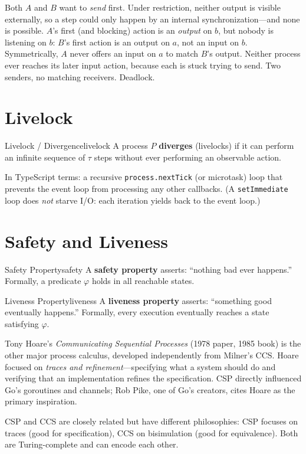 \documentclass[11pt, a4paper, oneside]{book}
\newcommand{\lc}[1]{\texttt{#1}}
\begin{document}
Both $A$ and $B$ want to \emph{send} first. Under restriction, neither output
is visible externally, so a step could only happen by an internal
synchronization---and none is possible. $A$'s first (and blocking) action is
an \emph{output} on $b$, but nobody is listening on $b$: $B$'s first action is
an output on $a$, not an input on $b$. Symmetrically, $A$ never offers an
input on $a$ to match $B$'s output. Neither process ever reaches its later
input action, because each is stuck trying to send. Two senders, no matching
receivers. Deadlock.

\section{Livelock}

\begin{defn}{Livelock / Divergence}{livelock}
A process $P$ \textbf{diverges} (livelocks) if it can perform an infinite
sequence of $\tau$ steps without ever performing an observable action.
\end{defn}

In TypeScript terms: a recursive \lc{process.nextTick} (or microtask) loop
that prevents the event loop from processing any other callbacks. (A
\lc{setImmediate} loop does \emph{not} starve I/O: each iteration yields back
to the event loop.)

\section{Safety and Liveness}

\begin{defn}{Safety Property}{safety}
A \textbf{safety property} asserts: ``nothing bad ever happens.'' Formally,
a predicate $\varphi$ holds in all reachable states.
\end{defn}

\begin{defn}{Liveness Property}{liveness}
A \textbf{liveness property} asserts: ``something good eventually happens.''
Formally, every execution eventually reaches a state satisfying $\varphi$.
\end{defn}

\begin{historical}[title={Hoare and CSP}]
Tony Hoare's \textit{Communicating Sequential Processes} (1978 paper, 1985
book) is the other major process calculus, developed independently from
Milner's CCS. Hoare focused on \emph{traces and refinement}---specifying what
a system should do and verifying that an implementation refines the
specification. CSP directly influenced Go's goroutines and channels; Rob Pike,
one of Go's creators, cites Hoare as the primary inspiration.

CSP and CCS are closely related but have different philosophies: CSP focuses
on traces (good for specification), CCS on bisimulation (good for
equivalence). Both are Turing-complete and can encode each other.
\end{historical}
\end{document}
